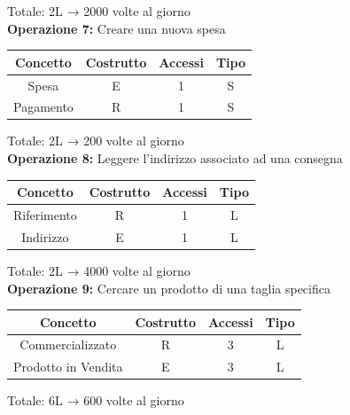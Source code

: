 \documentclass[a4paper,12pt]{report}
\begin{document}
Totale: 2L → 2000 volte al giorno\\
\textbf{Operazione 7:}
Creare una nuova spesa\\
\begin{center}
    \begin{tabular}{ | c   c   c   c | } 
    \hline
	Concetto&Costrutto&Accessi&Tipo\\
	\hline
	Spesa&E&1&S\\
	\hline
	Pagamento&R&1&S\\
	\hline
	\end{tabular}
\end{center}
Totale: 2L → 200 volte al giorno\\
\textbf{Operazione 8:}
Leggere l'indirizzo associato ad una consegna\\
\begin{center}
    \begin{tabular}{ | c   c   c   c | } 
    \hline
	Concetto&Costrutto&Accessi&Tipo\\
	\hline
	Riferimento&R&1&L\\
	\hline
    Indirizzo&E&1&L\\
	\hline
	\end{tabular}
\end{center}
Totale: 2L → 4000 volte al giorno\\
\textbf{Operazione 9:}
Cercare un prodotto di una taglia specifica\\
\begin{center}
    \begin{tabular}{ | c   c   c   c | } 
    \hline
	Concetto&Costrutto&Accessi&Tipo\\
	\hline
	Commercializzato&R&3&L\\
	\hline
    Prodotto in Vendita&E&3&L\\
	\hline
	\end{tabular}
\end{center}
Totale: 6L → 600 volte al giorno\\
\end{document}
